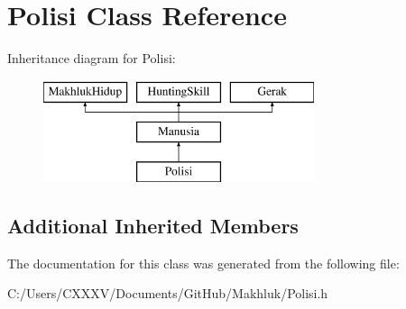 \hypertarget{class_polisi}{}\section{Polisi Class Reference}
\label{class_polisi}
Inheritance diagram for Polisi\+:\begin{figure}[H]
\begin{center}
\leavevmode
\includegraphics[height=3.000000cm]{class_polisi}
\end{center}
\end{figure}
\subsection*{Additional Inherited Members}


The documentation for this class was generated from the following file\+:\begin{DoxyCompactItemize}
\item 
C\+:/\+Users/\+C\+X\+X\+X\+V/\+Documents/\+Git\+Hub/\+Makhluk/Polisi.\+h\end{DoxyCompactItemize}
